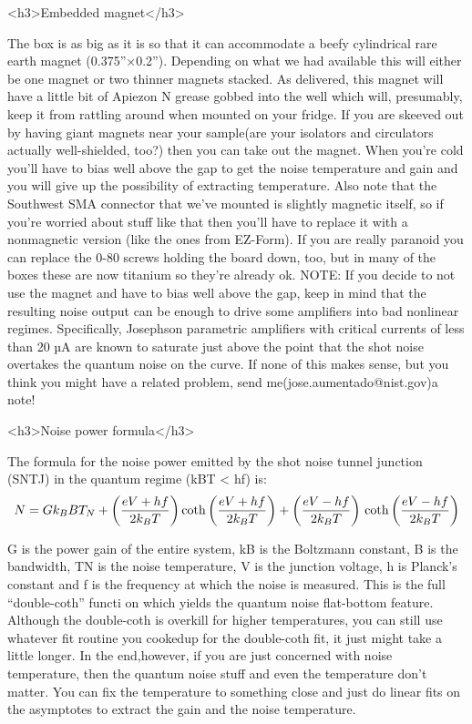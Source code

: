 \documentclass[11pt]{article}
\begin{document}
<h3>Embedded magnet</h3> 



    The box is as big as it is so that it can accommodate a beefy cylindrical rare earth magnet (0.375”×0.2”). Depending on what we had available this will either be one magnet or two thinner magnets stacked. As delivered, this magnet will have a little bit of Apiezon N grease gobbed into the well which will, presumably, keep it from rattling around when mounted on your fridge. If you are skeeved out by having giant magnets near your sample(are your isolators and circulators actually well-shielded, too?) then you can take out the magnet. When you’re cold you’ll have to bias well above the gap to get the noise temperature and gain and you will give up the possibility of extracting temperature. Also note that the Southwest SMA connector that we’ve mounted is slightly magnetic itself, so if you’re worried about stuff like that then you’ll have to replace it with a nonmagnetic version (like the ones from EZ-Form). If you are really paranoid you can replace the 0-80 screws holding the board down, too, but in many of the boxes these are now titanium so they’re already ok. NOTE: If you decide to not use the magnet and have to bias well above the gap, keep in mind that the resulting noise output can be enough to drive some ampliﬁers into bad nonlinear regimes. Specifically, Josephson parametric ampliﬁers with critical currents of less than 20 µA are known to saturate just above the point that the shot noise overtakes the quantum noise on the curve. If none of this makes sense, but you think you might have a related problem, send me(jose.aumentado@nist.gov)a note!

<h3>Noise power formula</h3>



The formula for the noise power emitted by the shot noise tunnel junction (SNTJ) in the quantum regime (kBT < hf) is: 
$$
N= Gk_BBT_N + \left(\frac{eV + hf}{2k_BT}\right)
\coth{\left(\frac{eV + hf}{2k_BT}\right)} + \left(\frac{eV - hf}{2k_BT}\right) \\ 
\coth{\left(\frac{eV - hf}{2k_BT}\right)}
$$

G is the power gain of the entire system, kB is the Boltzmann constant, B is the bandwidth, TN is  the noise temperature, V is the junction voltage, h is Planck’s constant and f is the frequency at which the noise is measured. This is the full “double-coth” functi on which yields the quantum noise ﬂat-bottom feature. Although the double-coth is overkill for higher temperatures, you can still use whatever ﬁt routine you cookedup for the double-coth ﬁt, it just might take a little longer. In the end,however, if you are just concerned with noise temperature, then the quantum noise stuff and even the temperature don’t matter. You can ﬁx the temperature to something close and just do linear ﬁts on the asymptotes to extract the gain and the noise temperature.
\end{document}
